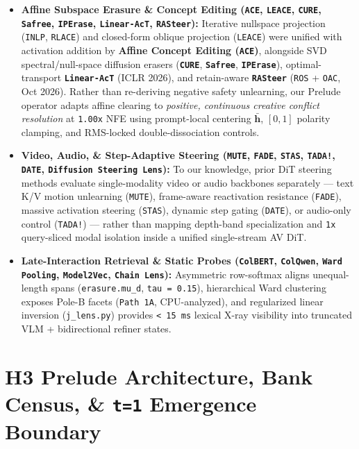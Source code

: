 \documentclass[10pt]{article}
\begin{document}
\begin{itemize}[leftmargin=*]
\item \textbf{Affine Subspace Erasure \& Concept Editing (\texttt{ACE}, \texttt{LEACE}, \texttt{CURE}, \texttt{Safree}, \texttt{IPErase}, \texttt{Linear-AcT}, \texttt{RASteer}):} Iterative nullspace projection (\texttt{INLP}, \texttt{RLACE}) and closed-form oblique projection (\texttt{LEACE}) were unified with activation addition by \textbf{Affine Concept Editing (\texttt{ACE})}, alongside SVD spectral/null-space diffusion erasers (\textbf{\texttt{CURE}}, \textbf{\texttt{Safree}}, \textbf{\texttt{IPErase}}), optimal-transport \textbf{\texttt{Linear-AcT}} (ICLR 2026), and retain-aware \textbf{\texttt{RASteer}} (\texttt{ROS} + \texttt{OAC}, Oct 2026). Rather than re-deriving negative safety unlearning, our Prelude operator adapts affine clearing to \emph{positive, continuous creative conflict resolution} at \texttt{1.00x} NFE using prompt-local centering $\bar{\mathbf{h}}$, $[0,1]$ polarity clamping, and RMS-locked double-dissociation controls.
\item \textbf{Video, Audio, \& Step-Adaptive Steering (\texttt{MUTE}, \texttt{FADE}, \texttt{STAS}, \texttt{TADA!}, \texttt{DATE}, \texttt{Diffusion Steering Lens}):} To our knowledge, prior DiT steering methods evaluate single-modality video or audio backbones separately --- text K/V motion unlearning (\texttt{MUTE}), frame-aware reactivation resistance (\texttt{FADE}), massive activation steering (\texttt{STAS}), dynamic step gating (\texttt{DATE}), or audio-only control (\texttt{TADA!}) --- rather than mapping depth-band specialization and \texttt{1x} query-sliced modal isolation inside a unified single-stream AV DiT.
\item \textbf{Late-Interaction Retrieval \& Static Probes (\texttt{ColBERT}, \texttt{ColQwen}, \texttt{Ward Pooling}, \texttt{Model2Vec}, \texttt{Chain Lens}):} Asymmetric row-softmax aligns unequal-length spans (\texttt{erasure.mu\_d}, \texttt{tau = 0.15}), hierarchical Ward clustering exposes Pole-B facets (\texttt{Path 1A}, CPU-analyzed), and regularized linear inversion (\texttt{j\_lens.py}) provides \texttt{< 15 ms} lexical X-ray visibility into truncated VLM + bidirectional refiner states.
\end{itemize}


\section{H3 Prelude Architecture, Bank Census, \& \texttt{t=1} Emergence Boundary}
\end{document}
